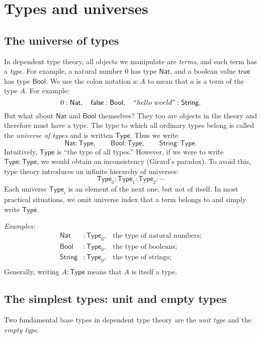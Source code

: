 \documentclass{article}
\newcommand{\Type}{\mathsf{Type}}
\newcommand{\Nat}{\mathsf{Nat}}
\newcommand{\Bool}{\mathsf{Bool}}
\newcommand{\String}{\mathsf{String}}
\begin{document}
\section{Types and universes}

\subsection*{The universe of types}

In dependent type theory, all objects we manipulate are \emph{terms}, and each term has a \emph{type}.  
For example, a natural number \(0\) has type \(\Nat\), and a boolean value \(\mathsf{true}\) has type \(\Bool\). We use the colon notation \(a : A\) to mean that \(a\) is a term of the type \(A\).  
For example:
\[
0 : \Nat, \quad \mathsf{false} : \Bool, \quad ``hello \ world" : \String.
\]
But what about \(\Nat\) and \(\Bool\) themselves?  
They too are objects in the theory and therefore must have a type.  
The type to which all ordinary types belong is called the \emph{universe of types} and is written \(\Type\).  
Thus we write
\[
\Nat : \Type, \qquad \Bool : \Type, \qquad \String : \Type.
\]
Intuitively, \(\Type\) is “the type of all types.”  
However, if we were to write \(\Type : \Type\), we would obtain an inconsistency (Girard’s paradox).  
To avoid this, type theory introduces an infinite hierarchy of universes:
\[
\Type_0 : \Type_1 : \Type_2 : \cdots
\]
Each universe \(\Type_i\) is an element of the next one, but not of itself.  
In most practical situations, we omit universe index that a term belongs to and simply write \(\Type\). 

\emph{Examples:}
\[
\begin{aligned}
\Nat &:\Type_0, &\text{the type of natural numbers;}\\
\Bool &:\Type_0, &\text{the type of booleans;}\\
\String &:\Type_0, &\text{the type of strings;}\\
\end{aligned}
\]
Generally, writing \(A : \Type\) means that \(A\) is itself a type.

\subsection*{The simplest types: unit and empty types}

Two fundamental base types in dependent type theory are the \emph{unit type} and the \emph{empty type}.  
\end{document}
